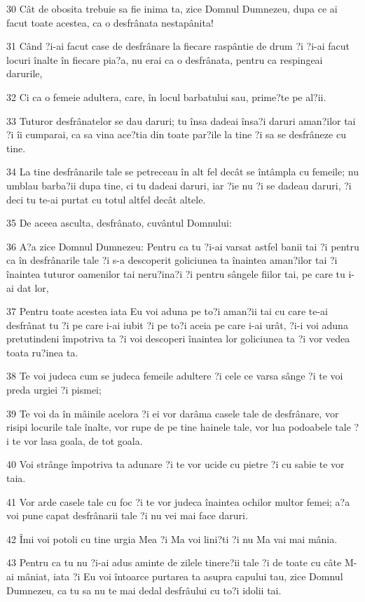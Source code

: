 \par 30 Cât de obosita trebuie sa fie inima ta, zice Domnul Dumnezeu, dupa ce ai facut toate acestea, ca o desfrânata nestapânita!
\par 31 Când ?i-ai facut case de desfrânare la fiecare raspântie de drum ?i ?i-ai facut locuri înalte în fiecare pia?a, nu erai ca o desfrânata, pentru ca respingeai darurile,
\par 32 Ci ca o femeie adultera, care, în locul barbatului sau, prime?te pe al?ii.
\par 33 Tuturor desfrânatelor se dau daruri; tu însa dadeai însa?i daruri aman?ilor tai ?i îi cumparai, ca sa vina ace?tia din toate par?ile la tine ?i sa se desfrâneze cu tine.
\par 34 La tine desfrânarile tale se petreceau în alt fel decât se întâmpla cu femeile; nu umblau barba?ii dupa tine, ci tu dadeai daruri, iar ?ie nu ?i se dadeau daruri, ?i deci tu te-ai purtat cu totul altfel decât altele.
\par 35 De aceea asculta, desfrânato, cuvântul Domnului:
\par 36 A?a zice Domnul Dumnezeu: Pentru ca tu ?i-ai varsat astfel banii tai ?i pentru ca în desfrânarile tale ?i s-a descoperit goliciunea ta înaintea aman?ilor tai ?i înaintea tuturor oamenilor tai neru?ina?i ?i pentru sângele fiilor tai, pe care tu i-ai dat lor,
\par 37 Pentru toate acestea iata Eu voi aduna pe to?i aman?ii tai cu care te-ai desfrânat tu ?i pe care i-ai iubit ?i pe to?i aceia pe care i-ai urât, ?i-i voi aduna pretutindeni împotriva ta ?i voi descoperi înaintea lor goliciunea ta ?i vor vedea toata ru?inea ta.
\par 38 Te voi judeca cum se judeca femeile adultere ?i cele ce varsa sânge ?i te voi preda urgiei ?i pismei;
\par 39 Te voi da în mâinile acelora ?i ei vor darâma casele tale de desfrânare, vor risipi locurile tale înalte, vor rupe de pe tine hainele tale, vor lua podoabele tale ?i te vor lasa goala, de tot goala.
\par 40 Voi strânge împotriva ta adunare ?i te vor ucide cu pietre ?i cu sabie te vor taia.
\par 41 Vor arde casele tale cu foc ?i te vor judeca înaintea ochilor multor femei; a?a voi pune capat desfrânarii tale ?i nu vei mai face daruri.
\par 42 Îmi voi potoli cu tine urgia Mea ?i Ma voi lini?ti ?i nu Ma vai mai mânia.
\par 43 Pentru ca tu nu ?i-ai adus aminte de zilele tinere?ii tale ?i de toate cu câte M-ai mâniat, iata ?i Eu voi întoarce purtarea ta asupra capului tau, zice Domnul Dumnezeu, ca tu sa nu te mai dedal desfrâului cu to?i idolii tai.
